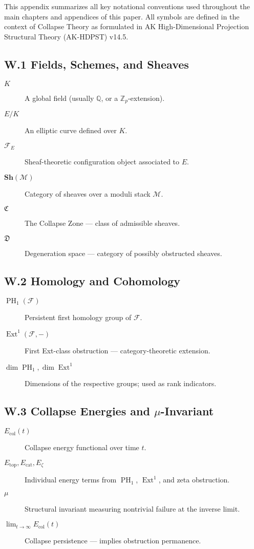 \documentclass[11pt]{article}
\DeclareMathOperator{\Ext}{Ext}
\DeclareMathOperator{\PH}{PH}
\begin{document}
This appendix summarizes all key notational conventions used throughout the main chapters and appendices of this paper. All symbols are defined in the context of Collapse Theory as formulated in AK High-Dimensional Projection Structural Theory (AK-HDPST) v14.5.

\subsection*{W.1 Fields, Schemes, and Sheaves}

\begin{description}
  \item[\( K \)] A global field (usually \( \mathbb{Q} \), or a \( \mathbb{Z}_p \)-extension).
  \item[\( E/K \)] An elliptic curve defined over \( K \).
  \item[\( \mathcal{F}_E \)] Sheaf-theoretic configuration object associated to \( E \).
  \item[\( \mathbf{Sh}(\mathcal{M}) \)] Category of sheaves over a moduli stack \( \mathcal{M} \).
  \item[\( \mathfrak{C} \)] The Collapse Zone — class of admissible sheaves.
  \item[\( \mathfrak{D} \)] Degeneration space — category of possibly obstructed sheaves.
\end{description}

\subsection*{W.2 Homology and Cohomology}

\begin{description}
  \item[\( \PH_1(\mathcal{F}) \)] Persistent first homology group of \( \mathcal{F} \).
  \item[\( \Ext^1(\mathcal{F}, -) \)] First Ext-class obstruction — category-theoretic extension.
  \item[\( \dim \PH_1, \dim \Ext^1 \)] Dimensions of the respective groups; used as rank indicators.
\end{description}

\subsection*{W.3 Collapse Energies and \(\mu\)-Invariant}

\begin{description}
  \item[\( E_{\mathrm{col}}(t) \)] Collapse energy functional over time \( t \).
  \item[\( E_{\mathrm{top}}, E_{\mathrm{cat}}, E_{\zeta} \)] Individual energy terms from \( \PH_1 \), \( \Ext^1 \), and zeta obstruction.
  \item[\( \mu \)] Structural invariant measuring nontrivial failure at the inverse limit.
  \item[\( \lim_{t \to \infty} E_{\mathrm{col}}(t) \)] Collapse persistence — implies obstruction permanence.
\end{description}
\end{document}
